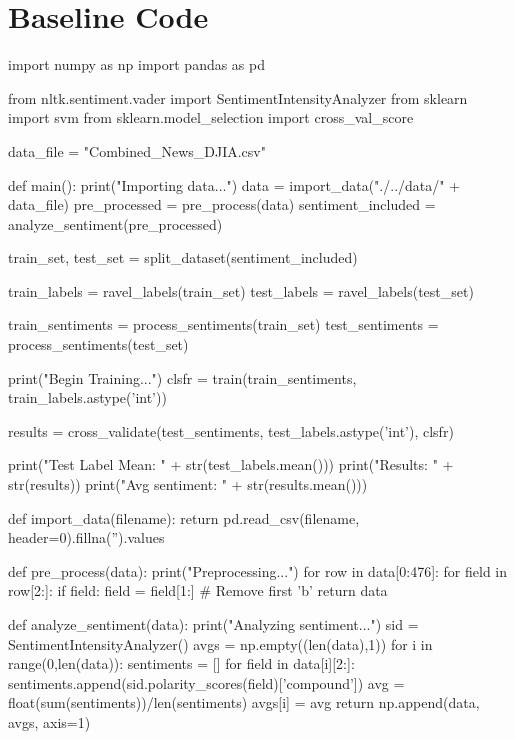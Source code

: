 \documentclass{article} %
\begin{document}


\section{Baseline Code}

\begin{python}
import numpy as np
import pandas as pd

from nltk.sentiment.vader import SentimentIntensityAnalyzer
from sklearn import svm
from sklearn.model_selection import cross_val_score

data_file = "Combined_News_DJIA.csv"

def main():
  print("Importing data...")
  data = import_data("./../data/" + data_file)
  pre_processed = pre_process(data)
  sentiment_included = analyze_sentiment(pre_processed)

  train_set, test_set = split_dataset(sentiment_included)

  train_labels = ravel_labels(train_set)
  test_labels = ravel_labels(test_set)

  train_sentiments = process_sentiments(train_set)
  test_sentiments = process_sentiments(test_set)

  print("Begin Training...")
  clsfr = train(train_sentiments, train_labels.astype('int'))

  results = cross_validate(test_sentiments, test_labels.astype('int'), clsfr)

  print("Test Label Mean: " + str(test_labels.mean()))
  print("Results: " + str(results))
  print("Avg sentiment: " + str(results.mean()))

def import_data(filename):
  return pd.read_csv(filename, header=0).fillna('').values

def pre_process(data):
  print("Preprocessing...")
  for row in data[0:476]:
    for field in row[2:]:
      if field:
        field = field[1:] # Remove first 'b'
  return data

def analyze_sentiment(data):
  print("Analyzing sentiment...")
  sid = SentimentIntensityAnalyzer()
  avgs = np.empty((len(data),1))
  for i in range(0,len(data)):
    sentiments = []
    for field in data[i][2:]:
      sentiments.append(sid.polarity_scores(field)['compound'])
    avg = float(sum(sentiments))/len(sentiments)
    avgs[i] = avg
  return np.append(data, avgs, axis=1)


\end{python}
\end{document}
